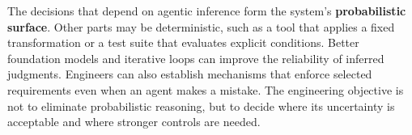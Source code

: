 
The decisions that depend on agentic inference form the system's \textbf{probabilistic surface}. Other parts may be deterministic, such as a tool that applies a fixed transformation or a test suite that evaluates explicit conditions. Better foundation models and iterative loops can improve the reliability of inferred judgments. Engineers can also establish mechanisms that enforce selected requirements even when an agent makes a mistake. The engineering objective is not to eliminate probabilistic reasoning, but to decide where its uncertainty is acceptable and where stronger controls are needed.
